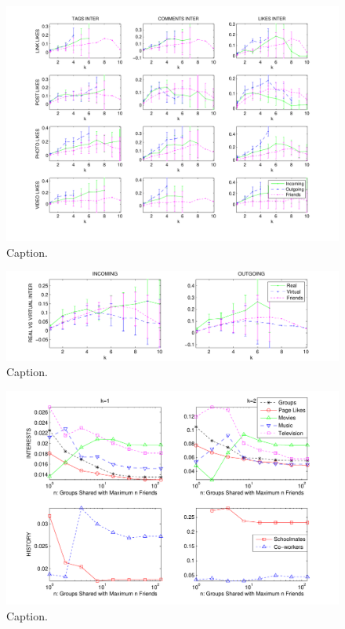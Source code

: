 \begin{figure}[t!]
\centering
\includegraphics[scale=0.70]{data/linktype_vs_inter_fix}
\caption{Caption.}
\label{fig:res3}
\end{figure}


\begin{figure}[t!]
\centering
\includegraphics[scale=0.75]{data/real_vs_virtual_fix}
\caption{Caption.}
\label{fig:res4}
\end{figure}

\begin{figure}[t!]
\centering
\includegraphics[scale=0.80]{data/interests_fix}
\caption{Caption.}
\label{fig:res4}
\end{figure}

